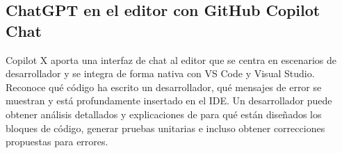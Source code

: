 \subsection{ChatGPT en el editor con GitHub Copilot Chat}

Copilot X aporta una interfaz de chat al editor que se centra en escenarios de desarrollador y se 
integra de forma nativa con VS Code y Visual Studio. Reconoce qué código ha escrito un desarrollador, 
qué mensajes de error se muestran y está profundamente insertado en el IDE. Un desarrollador puede 
obtener análisis detallados y explicaciones de para qué están diseñados los bloques de código, 
generar pruebas unitarias e incluso obtener correcciones propuestas para errores.


